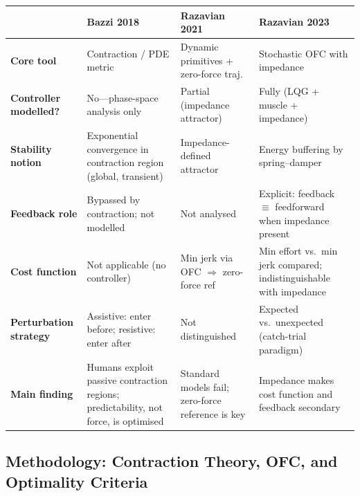 \documentclass[11pt]{article}
\begin{document}
\begin{center}
\small
\begin{tabular}{@{}lp{3.2cm}p{3.2cm}p{3.2cm}@{}}
\toprule
 & \textbf{Bazzi 2018} & \textbf{Razavian 2021} & \textbf{Razavian 2023} \\
\midrule
\textbf{Core tool} & Contraction / PDE metric & Dynamic primitives + zero-force traj.& Stochastic OFC with impedance \\
\textbf{Controller modelled?} & No---phase-space analysis only & Partial (impedance attractor) & Fully (LQG + muscle + impedance) \\
\textbf{Stability notion} & Exponential convergence in contraction region (global, transient) & Impedance-defined attractor & Energy buffering by spring--damper \\
\textbf{Feedback role} & Bypassed by contraction; not modelled & Not analysed & Explicit: feedback $\equiv$ feedforward when impedance present \\
\textbf{Cost function} & Not applicable (no controller) & Min jerk via OFC $\Rightarrow$ zero-force ref & Min effort vs.\ min jerk compared; indistinguishable with impedance \\
\textbf{Perturbation strategy} & Assistive: enter before; resistive: enter after & Not distinguished & Expected vs.\ unexpected (catch-trial paradigm) \\
\textbf{Main finding} & Humans exploit passive contraction regions; predictability, not force, is optimised & Standard models fail; zero-force reference is key & Impedance makes cost function and feedback secondary \\
\bottomrule
\end{tabular}
\end{center}

\subsection*{Methodology: Contraction Theory, OFC, and Optimality Criteria}
\end{document}
